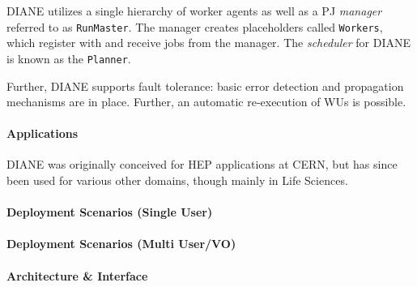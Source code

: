 \documentclass{sig-alternate}
\begin{document}
DIANE utilizes a single hierarchy of worker agents as well as a PJ \textit{manager}
referred to as \texttt{RunMaster}.  The manager creates
placeholders called \texttt{Workers}, which register with and receive jobs from the manager.
The \textit{scheduler} for DIANE is known as the \texttt{Planner}.


Further, DIANE supports fault tolerance: basic error detection and
propagation mechanisms are in place. Further, an automatic re-execution of WUs
is possible.

\paragraph{Applications}

DIANE was originally conceived for HEP applications at CERN, but has since been
used for various other domains, though mainly in Life Sciences.

\paragraph{Deployment Scenarios (Single User)}




\paragraph{Deployment Scenarios (Multi User/VO)}



\paragraph{Architecture \& Interface}
\end{document}
